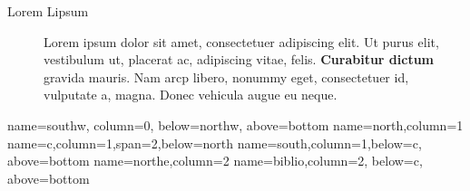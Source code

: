 \documentclass[pdftex, british, 
a0paper,
landscape,
fontscale=0.46
]{baposter}
\newcommand{\zoom}[1]{\textcolor{sta-blue}{\textbf{#1}}}
\begin{document}
\begin{poster}
{\begin{description}
\item[Lorem Lipsum] Lorem ipsum dolor sit amet, consectetuer
  adipiscing elit. Ut purus elit, vestibulum ut, placerat ac,
  adipiscing vitae, felis. \zoom{Curabitur dictum} gravida
  mauris. Nam arcp libero, nonummy eget, consectetuer id, vulputate a,
  magna. Donec vehicula augue eu neque. 
 
\end{description}
}
          {name=southw, column=0, below=northw, above=bottom}
{\lipsum}
          {name=north,column=1}
{\lipsum}
          {name=c,column=1,span=2,below=north}
{\lipsum}
          {name=south,column=1,below=c, above=bottom}
{\lipsum}
          {name=northe,column=2}
{\lipsum}
          {name=biblio,column=2, below=c, above=bottom}
{}
\end{poster}%
\end{document}
